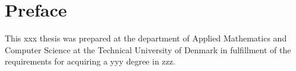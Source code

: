 \chapter{Preface}
This xxx thesis was prepared at the department of Applied Mathematics and Computer Science at the Technical University of Denmark in fulfillment of the requirements for acquiring a yyy degree in zzz.

\vfill

\iffalse
{
\centering
    \thesislocation{}, \today\\[1cm]
\begin{flushright}
    \thesisauthor{}
\end{flushright}
}
\fi